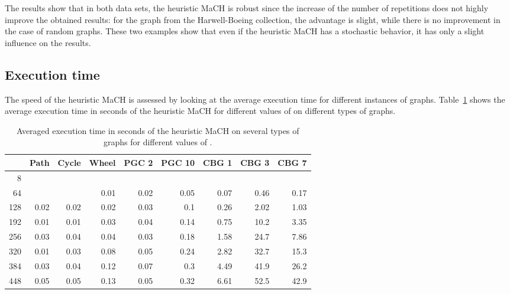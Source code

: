 \documentclass{scrartcl}
\theoremstyle{plain}
\newcommand{\algo}{MaCH}
\begin{document}
The results show that in both data sets, the heuristic \algo{} is robust since 
the increase of the number of repetitions does not highly improve the obtained 
results: for the graph from the Harwell-Boeing collection, the advantage is 
slight, while there is no improvement in the case of random graphs. These two 
examples show that even if the heuristic \algo{} has a stochastic behavior, it 
has only a slight influence on the results. 


\subsection{Execution time}

The speed of the heuristic \algo{} is assessed by looking at the average 
execution time for different instances of graphs. Table~\ref{tab:time_standard} 
shows the average execution time in seconds of the heuristic \algo{} for 
different values of  on different types of graphs.
\begin{table}[!ht]
	\centering
	\small
	\begin{tabular}{|r|rrrrrrrr|}
		\hline
		\multicolumn{1}{|c|}{} &
		\multicolumn{1}{c}{Path} & 
		\multicolumn{1}{c}{Cycle} & 
		\multicolumn{1}{c}{Wheel} & 
		\multicolumn{1}{c}{PGC 2} & 
		\multicolumn{1}{c}{PGC 10} & 
		\multicolumn{1}{c}{CBG 1} & 
		\multicolumn{1}{c}{CBG 3} & 
		\multicolumn{1}{c|}{CBG 7} \\ \hline

		\makeatletter{}8 & & & & & & & & \\ 
64 & & & 0.01 & 0.02 & 0.05 & 0.07 & 0.46 & 0.17 \\ 
128 & 0.02 & 0.02 & 0.02 & 0.03 & 0.1 & 0.26 & 2.02 & 1.03 \\ 
192 & 0.01 & 0.01 & 0.03 & 0.04 & 0.14 & 0.75 & 10.2 & 3.35 \\ 
256 & 0.03 & 0.04 & 0.04 & 0.03 & 0.18 & 1.58 & 24.7 & 7.86 \\ 
320 & 0.01 & 0.03 & 0.08 & 0.05 & 0.24 & 2.82 & 32.7 & 15.3 \\ 
384 & 0.03 & 0.04 & 0.12 & 0.07 & 0.3 & 4.49 & 41.9 & 26.2 \\ 
448 & 0.05 & 0.05 & 0.13 & 0.05 & 0.32 & 6.61 & 52.5 & 42.9 \\  

		\hline
	\end{tabular}
	\caption{\label{tab:time_standard}Averaged execution time in seconds of 
the heuristic \algo{} on several types of graphs for different values of .}

\end{table}
\end{document}
